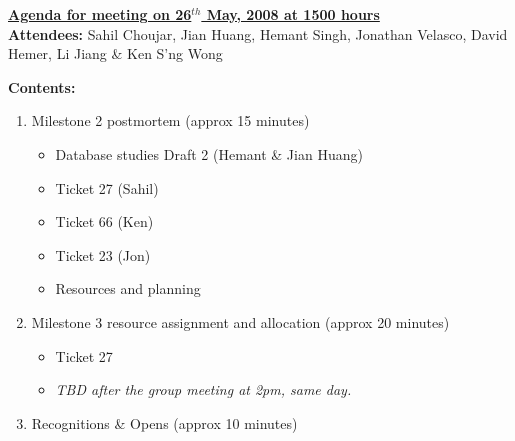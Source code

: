\documentclass{letter}
\begin{document}
{\large \textbf{\underline{Agenda for meeting on 26$^{th}$ May, 2008 at 1500 hours}}}\\

\textbf{Attendees:} Sahil Choujar, Jian Huang, Hemant Singh, Jonathan Velasco, David Hemer, Li Jiang \& Ken S'ng Wong

\textbf{Contents:}

\begin{enumerate}
	\item Milestone 2 postmortem (approx 15 minutes)
		\begin{itemize}
			\item Database studies Draft 2 (Hemant \& Jian Huang)
			\item Ticket 27 (Sahil)
			\item Ticket 66 (Ken)
			\item Ticket 23 (Jon)
			\item Resources and planning
		\end{itemize}
	\item Milestone 3 resource assignment and allocation (approx 20 minutes)
		\begin{itemize}
			\item Ticket 27 
			\item \textsl{TBD after the group meeting at 2pm, same day.}
		\end{itemize}
	\item Recognitions \& Opens (approx 10 minutes)
\end{enumerate}
 
\end{document}

